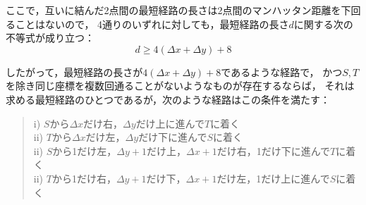 \documentclass{article}
\begin{document}
ここで，互いに結んだ2点間の最短経路の長さは2点間のマンハッタン距離を下回ることはないので，
4通りのいずれに対しても，最短経路の長さ$d$に関する次の不等式が成り立つ：
\begin{equation*}
    d \geq 4 (\Delta x + \Delta y) + 8
\end{equation*}

したがって，最短経路の長さが$4 (\Delta x + \Delta y) + 8$であるような経路で，
かつ$S, T$を除き同じ座標を複数回通ることがないようなものが存在するならば，
それは求める最短経路のひとつであるが，次のような経路はこの条件を満たす：
\begin{quote}
    i) $S$から$\Delta x$だけ右，$\Delta y$だけ上に進んで$T$に着く \\
    ii) $T$から$\Delta x$だけ左，$\Delta y$だけ下に進んで$S$に着く \\
    ii) $S$から1だけ左，$\Delta y + 1$だけ上，$\Delta x + 1$だけ右，1だけ下に進んで$T$に着く \\
    ii) $T$から1だけ右，$\Delta y + 1$だけ下，$\Delta x + 1$だけ左，1だけ上に進んで$S$に着く
\end{quote}
\end{document}

